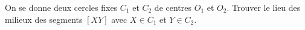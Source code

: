 On se donne deux cercles fixes $C_1$ et $C_2$ de centres $O_1$ et $O_2$. Trouver le lieu des milieux des segments $[XY]$ avec $X \in C_1$ et $Y \in C_2$.
